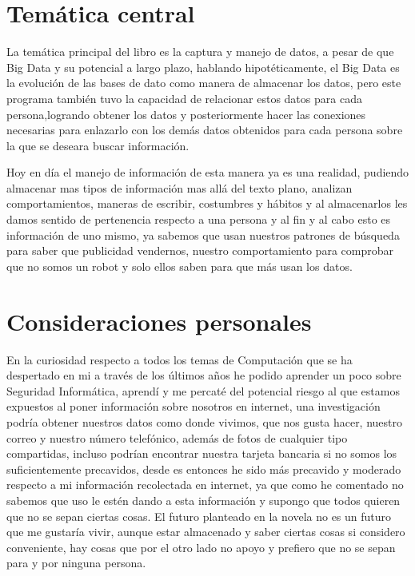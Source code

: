 \documentclass[paper=letter, fontsize=12pt]{scrartcl} %
\begin{document}
\section*{Temática central}

La temática principal del libro es la captura y manejo de datos, a pesar de que Big Data y su potencial a largo plazo, hablando hipotéticamente, el Big Data es la evolución de las bases de dato como manera de almacenar los datos, pero este programa también tuvo la capacidad de relacionar estos datos para cada persona,logrando obtener los datos y posteriormente hacer las conexiones necesarias para enlazarlo con los demás datos obtenidos para cada persona sobre la que se deseara buscar información.\vspace{4mm}

Hoy en día el manejo de información de esta manera ya es una realidad, pudiendo almacenar mas tipos de información mas allá del texto plano, analizan comportamientos, maneras de escribir, costumbres y hábitos y al almacenarlos les damos sentido de pertenencia respecto a una persona y al fin y al cabo esto es información de uno mismo, ya sabemos que usan nuestros patrones de búsqueda para saber que publicidad vendernos, nuestro comportamiento para comprobar que no somos un robot y solo ellos saben para que más usan los datos.


\section*{Consideraciones personales}

En la curiosidad respecto a todos los temas de Computación que se ha despertado en mi a través de los últimos años he podido aprender un poco sobre Seguridad Informática, aprendí y me percaté del potencial riesgo al que estamos expuestos al poner información sobre nosotros en internet, una investigación podría obtener nuestros datos como donde vivimos, que nos gusta hacer, nuestro correo y nuestro número telefónico, además de fotos de cualquier tipo compartidas, incluso podrían encontrar nuestra tarjeta bancaria si no somos los suficientemente precavidos, desde es entonces he sido más precavido y moderado respecto a mi información recolectada en internet, ya que como he comentado no sabemos que uso le estén dando a esta información y supongo que todos quieren que no se sepan ciertas cosas. El futuro planteado en la novela no es un futuro que me gustaría vivir, aunque estar almacenado y saber ciertas cosas si considero conveniente, hay cosas que por el otro lado no apoyo y prefiero que no se sepan para y por ninguna persona.
\end{document}
